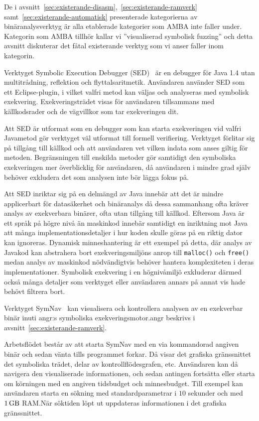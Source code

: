 De i avsnitt~\ref{sec:existerande-disasm},\ \ref{sec:existerande-ramverk} samt\
\ref{sec:existerande-automatisk} presenterade kategorierna av binäranalysverktyg
är alla etablerade kategorier som AMBA inte faller under. Kategorin som AMBA
tillhör kallar vi ''visualiserad symbolisk fuzzing'' och detta avsnitt
diskuterar det fåtal existerande verktyg som vi anser faller inom kategorin.

Verktyget Symbolic Execution Debugger
(\textsc{SED})~\cite{symbolic_execution_debugger} är en debugger för Java 1.4
utan multitrådning, reflektion och flyttalsaritmetik. Användaren använder
\textsc{SED} som ett Eclipse-plugin, i vilket valfri metod kan väljas och
analyseras med symbolisk exekvering. Exekveringsträdet visas för användaren
tillsammans med källkodsrader och de vägvillkor som tar exekveringen dit.

Att \textsc{SED} är utformat som en debugger som kan starta exekveringen vid
valfri Javametod gör verktyget väl utformat till formell verifiering. Verktyget
förlitar sig på tillgång till källkod och att användaren vet vilken indata som
anses giltig för metoden. Begränsningen till enskilda metoder gör samtidigt den
symboliska exekveringen mer överblicklig för användaren, då användaren i mindre
grad själv behöver exkludera det som analysen inte bör lägga fokus på.

Att \textsc{SED} inriktar sig på en delmängd av Java innebär att det är mindre
applicerbart för datasäkerhet och binäranalys då dessa sammanhang ofta kräver
analys av exekverbara binärer, ofta utan tillgång till källkod. Eftersom Java är
ett språk på högre nivå än maskinkod innebär samtidigt en inriktning mot Java
att många implementationsdetaljer i hur koden skulle göras på en riktig dator
kan ignoreras. Dynamisk minneshantering är ett exempel på detta, där analys av
Javakod kan abstrahera bort exekveringsmiljöns anrop till \verb|malloc()| och
\verb|free()| medan analys av maskinkod nödvändigtvis behöver hantera
komplexiteten i deras implementationer. Symbolisk exekvering i en högnivåmiljö
exkluderar därmed också många detaljer som verktyget eller användaren annars på
annat vis hade behövt filtrera bort.

Verktyget SymNav~\cite{symnav} kan visualisera och kontrollera analysen av en
exekverbar binär inuti angr:s symboliska exekveringsmotor.\@ angr beskrivs i
avsnitt~\ref{sec:existerande-ramverk}.

Arbetsflödet består av att starta SymNav med en via kommandorad angiven binär
och sedan vänta tills programmet forkar. Då visar det grafiska gränssnittet det
symboliska trädet, delar av kontrollflödesgrafen, etc. Användaren kan då
navigera den visualiserade informationen, och sedan antingen fortsätta eller
starta om körningen med en angiven tidsbudget och minnesbudget. Till exempel kan
användaren starta en sökning med standardparametrar i $10$ sekunder och med
$\SI{1}{\giga\byte}$ RAM.\@ När söktiden löpt ut uppdateras informationen i
det grafiska gränssnittet.

